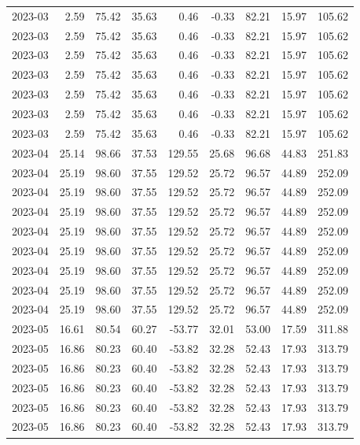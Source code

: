 \begin{table}[ht]
\begin{tabular}{lrrrrrrrr}
  2023-03 & 2.59 & 75.42 & 35.63 & 0.46 & -0.33 & 82.21 & 15.97 & 105.62 \\ 
  2023-03 & 2.59 & 75.42 & 35.63 & 0.46 & -0.33 & 82.21 & 15.97 & 105.62 \\ 
  2023-03 & 2.59 & 75.42 & 35.63 & 0.46 & -0.33 & 82.21 & 15.97 & 105.62 \\ 
  2023-03 & 2.59 & 75.42 & 35.63 & 0.46 & -0.33 & 82.21 & 15.97 & 105.62 \\ 
  2023-03 & 2.59 & 75.42 & 35.63 & 0.46 & -0.33 & 82.21 & 15.97 & 105.62 \\ 
  2023-03 & 2.59 & 75.42 & 35.63 & 0.46 & -0.33 & 82.21 & 15.97 & 105.62 \\ 
  2023-03 & 2.59 & 75.42 & 35.63 & 0.46 & -0.33 & 82.21 & 15.97 & 105.62 \\ 
  2023-04 & 25.14 & 98.66 & 37.53 & 129.55 & 25.68 & 96.68 & 44.83 & 251.83 \\ 
  2023-04 & 25.19 & 98.60 & 37.55 & 129.52 & 25.72 & 96.57 & 44.89 & 252.09 \\ 
  2023-04 & 25.19 & 98.60 & 37.55 & 129.52 & 25.72 & 96.57 & 44.89 & 252.09 \\ 
  2023-04 & 25.19 & 98.60 & 37.55 & 129.52 & 25.72 & 96.57 & 44.89 & 252.09 \\ 
  2023-04 & 25.19 & 98.60 & 37.55 & 129.52 & 25.72 & 96.57 & 44.89 & 252.09 \\ 
  2023-04 & 25.19 & 98.60 & 37.55 & 129.52 & 25.72 & 96.57 & 44.89 & 252.09 \\ 
  2023-04 & 25.19 & 98.60 & 37.55 & 129.52 & 25.72 & 96.57 & 44.89 & 252.09 \\ 
  2023-04 & 25.19 & 98.60 & 37.55 & 129.52 & 25.72 & 96.57 & 44.89 & 252.09 \\ 
  2023-04 & 25.19 & 98.60 & 37.55 & 129.52 & 25.72 & 96.57 & 44.89 & 252.09 \\ 
  2023-05 & 16.61 & 80.54 & 60.27 & -53.77 & 32.01 & 53.00 & 17.59 & 311.88 \\ 
  2023-05 & 16.86 & 80.23 & 60.40 & -53.82 & 32.28 & 52.43 & 17.93 & 313.79 \\ 
  2023-05 & 16.86 & 80.23 & 60.40 & -53.82 & 32.28 & 52.43 & 17.93 & 313.79 \\ 
  2023-05 & 16.86 & 80.23 & 60.40 & -53.82 & 32.28 & 52.43 & 17.93 & 313.79 \\ 
  2023-05 & 16.86 & 80.23 & 60.40 & -53.82 & 32.28 & 52.43 & 17.93 & 313.79 \\ 
  2023-05 & 16.86 & 80.23 & 60.40 & -53.82 & 32.28 & 52.43 & 17.93 & 313.79 \\ 

\end{tabular}
\end{table}
